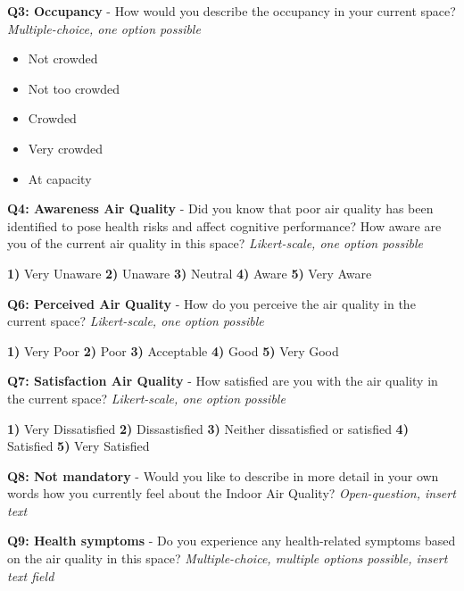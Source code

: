 \begin{appendices}
\textbf{Q3: Occupancy} - How would you describe the occupancy in your current space? \textit{Multiple-choice, one option possible}

\begin{itemize}
    \item Not crowded
    \item Not too crowded
    \item Crowded
    \item Very crowded
    \item At capacity
\end{itemize}

\textbf{Q4: Awareness Air Quality} - Did you know that poor air quality has been identified to pose health risks and affect cognitive performance? How aware are you of the current air quality in this space? \textit{Likert-scale, one option possible}

\textbf{1)} Very Unaware \textbf{2)} Unaware \textbf{3)} Neutral \textbf{4)} Aware \textbf{5)} Very Aware

\vspace{10pt}

\textbf{Q6: Perceived Air Quality} - How do you perceive the air quality in the current space? \textit{Likert-scale, one option possible}

\textbf{1)} Very Poor \textbf{2)} Poor \textbf{3)} Acceptable \textbf{4)} Good \textbf{5)} Very Good 

\vspace{10pt}

\textbf{Q7: Satisfaction Air Quality} - How satisfied are you with the air quality in the current space? \textit{Likert-scale, one option possible}

\textbf{1)} Very Dissatisfied \textbf{2)} Dissastisfied \textbf{3)} Neither dissatisfied or satisfied \textbf{4)} Satisfied \textbf{5)} Very Satisfied

\vspace{10pt}

\textbf{Q8: Not mandatory} - Would you like to describe in more detail in your own words how you currently feel about the Indoor Air Quality? \textit{Open-question, insert text}

\vspace{10pt}

\textbf{Q9: Health symptoms} - Do you experience any health-related symptoms based on the air quality in this space? \textit{Multiple-choice, multiple options possible, insert text field}


\end{appendices}
